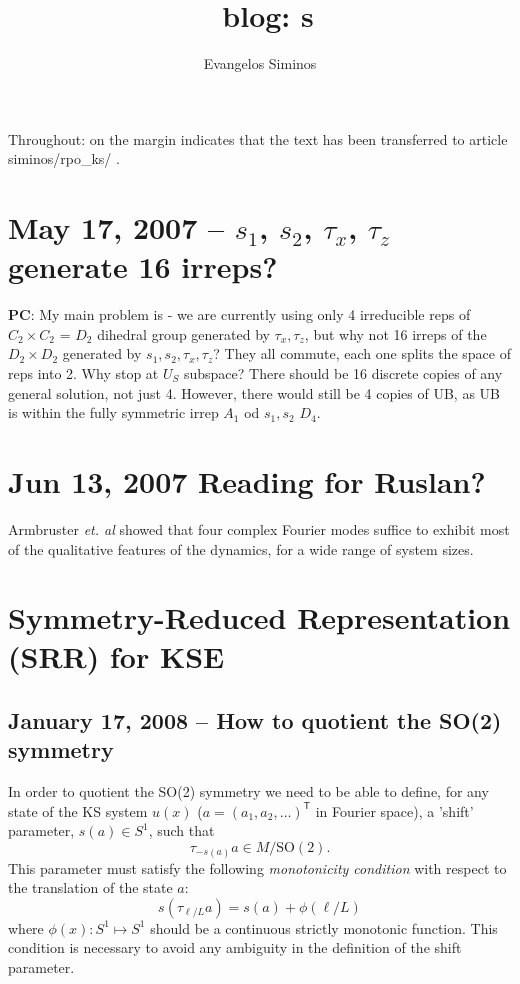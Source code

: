 \documentclass[letter,10pt]{article}
\title{\KS\ blog: \rpo s}
\author{Evangelos Siminos}
\begin{document}
\maketitle

\setcounter{page}{1}
\tableofcontents
\newpage

Throughout:  {\textdollar} on the margin
{\steady}
indicates that the text has been transferred to
article siminos/rpo\_ks/ .






\newpage

\section{May 17, 2007 -- $s_1$, $s_2$, $\tau_x$, $\tau_z$ generate 16 irreps?}

{\bf PC}: My main problem is - we are currently using only 4 irreducible reps
of $C_2 \times C_2$ = $D_2$ dihedral group generated by $\tau_x, \tau_z$,
but why not 16 irreps of
the $D_2 \times D_2$ generated by $s_1, s_2, \tau_x, \tau_z$?
They all commute, each one splits the space of reps into 2.
Why stop at $U_S$ subspace?
There should be 16 discrete copies of any
general solution, not just 4.
However, there would still be 4 copies of UB, as UB is within the
fully symmetric irrep $A_1$ od $s_1, s_2$ $D_4$.

\section{Jun 13, 2007 Reading for Ruslan?}

Armbruster {\em et. al} showed that four complex Fourier
modes suffice to exhibit most
of the qualitative features of the dynamics,
for a wide range of system sizes.

\section{Symmetry-Reduced Representation (SRR) for KSE}
\subsection{January 17, 2008 -- How to quotient the SO(2) symmetry}
In order to quotient the SO(2) symmetry we need to be able to define,
for any state of the KS system $u(x)$ 
($a = (a_1, a_2, \ldots)^\mathsf{T}$ in Fourier space),
a 'shift' parameter, $s(a) \in S^1 $, such that 
\[ \tau_{-s(a)} a \in M/\mathrm{SO}(2). \]
This parameter must satisfy the following {\em monotonicity condition} with
respect to the translation of the state $a$:
\[ s(\tau_{\ell/L}a) = s(a) + \phi(\ell/L) \]
where $\phi(x): S^1 \mapsto S^1$ should be a continuous strictly monotonic function.
This condition is necessary to avoid any ambiguity in the definition of
the shift parameter.
\end{document}
